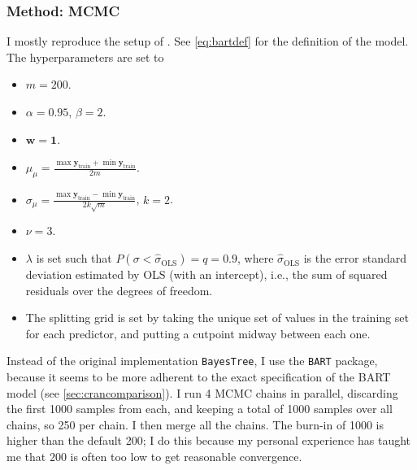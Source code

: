 \documentclass[a4paper]{article}
\theoremstyle{definition}
\begin{document}
    \subsubsection{Method: MCMC}
    \label{sec:modelmcmc}

    I mostly reproduce the setup of \textcite{chipman2010}. See \autoref{eq:bartdef} for the definition of the model. The hyperparameters are set to
    \begin{itemize}
        
        \item $m = 200$.

        \item $\alpha=0.95$, $\beta=2$.

        \item $\mathbf w = \mathbf 1$.

        \item $\displaystyle \mu_\mu = \frac{\max \mathbf y_\text{train} + \min \mathbf y_\text{train}}{2m}$.

        \item $\displaystyle \sigma_\mu = \frac{\max \mathbf y_\text{train} - \min \mathbf y_\text{train}}{2k\sqrt m}$, $k=2$.

        \item $\nu = 3$.

        \item $\lambda$ is set such that $P(\sigma<\hat\sigma_\text{OLS}) = q=0.9$, where $\hat\sigma_\text{OLS}$ is the error standard deviation estimated by OLS (with an intercept), i.e., the sum of squared residuals over the degrees of freedom.

        \item The splitting grid is set by taking the unique set of values in the training set for each predictor, and putting a cutpoint midway between each one.

    \end{itemize}
    Instead of the original implementation \texttt{BayesTree}, I use the \texttt{BART} package, because it seems to be more adherent to the exact specification of the BART model (see \autoref{sec:crancomparison}). I run 4 MCMC chains in parallel, discarding the first 1000 samples from each, and keeping a total of 1000 samples over all chains, so 250 per chain. I then merge all the chains. The burn-in of 1000 is higher than the default 200; I do this because my personal experience has taught me that 200 is often too low to get reasonable convergence.
\end{document}
